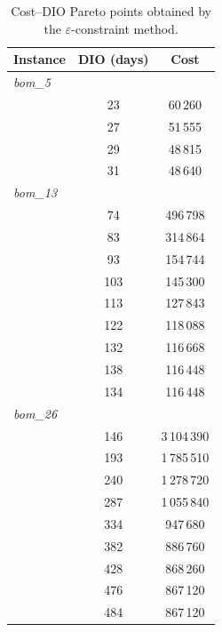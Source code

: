 \begin{table}[!htbp]\centering\small
\caption{Cost--DIO Pareto points obtained by the $\varepsilon$-constraint method.}\label{tab:paretodio}
\begin{tabular}{lcc}
\toprule
Instance & DIO (days) & Cost\\
\midrule
\multicolumn{3}{l}{\textit{bom\_5}} \\
 & 23 & 60\,260 \\
 & 27 & 51\,555 \\
 & 29 & 48\,815 \\
 & 31 & 48\,640 \\
\midrule
\multicolumn{3}{l}{\textit{bom\_13}} \\
 & 74 & 496\,798 \\
 & 83 & 314\,864 \\
 & 93 & 154\,744 \\
 & 103 & 145\,300 \\
 & 113 & 127\,843 \\
 & 122 & 118\,088 \\
 & 132 & 116\,668 \\
 & 138 & 116\,448 \\
 & 134 & 116\,448 \\
\midrule
\multicolumn{3}{l}{\textit{bom\_26}} \\
 & 146 & 3\,104\,390 \\
 & 193 & 1\,785\,510 \\
 & 240 & 1\,278\,720 \\
 & 287 & 1\,055\,840 \\
 & 334 & 947\,680 \\
 & 382 & 886\,760 \\
 & 428 & 868\,260 \\
 & 476 & 867\,120 \\
 & 484 & 867\,120 \\
\bottomrule
\end{tabular}
\end{table}
